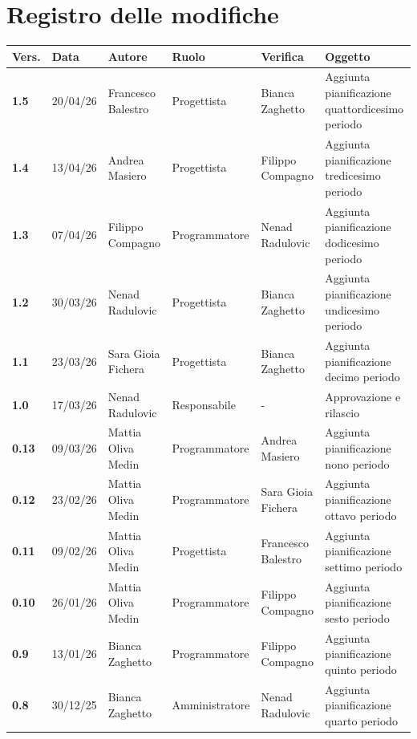 \documentclass[a4paper,12pt]{article}
\begin{document}


\newpage
\section*{Registro delle modifiche}
\begin{xltabular}{\textwidth}{|l|l|X|l|X|X|}
\hline
\textbf{Vers.} & \textbf{Data} & \textbf{Autore} & \textbf{Ruolo} & \textbf{Verifica} & \textbf{Oggetto} \\
\hline
\endhead
\endfoot
\hline
\endlastfoot
\textbf{1.5} & 20/04/26 & Francesco Balestro & Progettista & Bianca Zaghetto & Aggiunta pianificazione quattordicesimo periodo \\
\hline
\textbf{1.4} & 13/04/26 & Andrea Masiero & Progettista & Filippo Compagno & Aggiunta pianificazione tredicesimo periodo \\
\hline
\textbf{1.3} & 07/04/26 & Filippo Compagno & Programmatore & Nenad Radulovic & Aggiunta pianificazione dodicesimo periodo \\
\hline
\textbf{1.2} & 30/03/26 & Nenad Radulovic & Progettista & Bianca Zaghetto & Aggiunta pianificazione undicesimo periodo \\
\hline
\textbf{1.1} & 23/03/26 & Sara Gioia Fichera & Progettista & Bianca Zaghetto & Aggiunta pianificazione decimo periodo \\
\hline
\textbf{1.0} & 17/03/26 & Nenad Radulovic & Responsabile & - & Approvazione e rilascio \\
\hline
\textbf{0.13} & 09/03/26 & Mattia Oliva Medin & Programmatore & Andrea Masiero & Aggiunta pianificazione nono periodo \\
\hline
\textbf{0.12} & 23/02/26 & Mattia Oliva Medin & Programmatore & Sara Gioia Fichera & Aggiunta pianificazione ottavo periodo \\
\hline
\textbf{0.11} & 09/02/26 & Mattia Oliva Medin & Progettista & Francesco Balestro & Aggiunta pianificazione settimo periodo \\
\hline
\textbf{0.10} & 26/01/26 & Mattia Oliva Medin & Programmatore & Filippo Compagno & Aggiunta pianificazione sesto periodo \\
\hline
\textbf{0.9} & 13/01/26 & Bianca Zaghetto & Programmatore & Filippo Compagno & Aggiunta pianificazione quinto periodo \\
\hline
\textbf{0.8} & 30/12/25 & Bianca Zaghetto & Amministratore & Nenad Radulovic & Aggiunta pianificazione quarto periodo \\
\hline

\end{xltabular}
\end{document}

